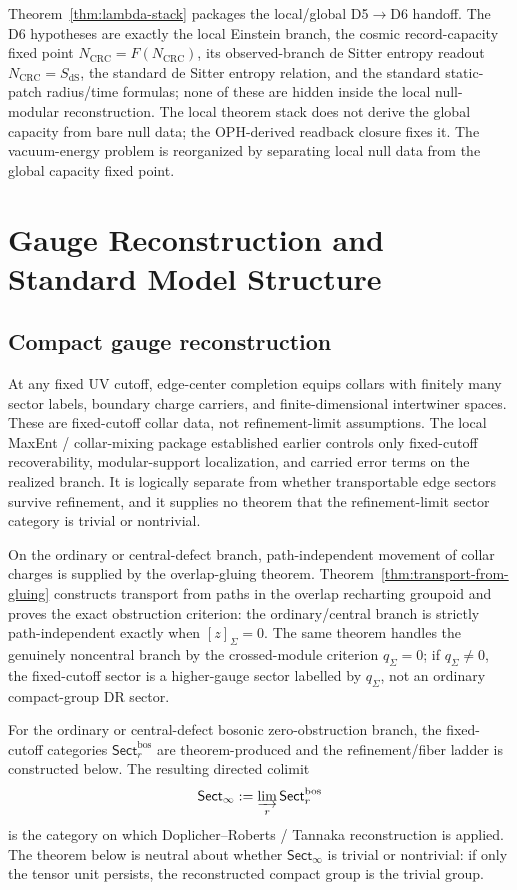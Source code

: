 \documentclass[11pt]{article}
\begin{document}
Theorem~\ref{thm:lambda-stack} packages the local/global D5\(\to\)D6 handoff. The D6 hypotheses are exactly the local Einstein branch, the cosmic record-capacity fixed point \(N_{\mathrm{CRC}}=F(N_{\mathrm{CRC}})\), its observed-branch de Sitter entropy readout \(N_{\mathrm{CRC}}=S_{\mathrm{dS}}\), the standard de Sitter entropy relation, and the standard static-patch radius/time formulas; none of these are hidden inside the local null-modular reconstruction. The local theorem stack does not derive the global capacity from bare null data; the OPH-derived readback closure fixes it. The vacuum-energy problem is reorganized by separating local null data from the global capacity fixed point.

\section{Gauge Reconstruction and Standard Model Structure}

\subsection{Compact gauge reconstruction}

At any fixed UV cutoff, edge-center completion equips collars with finitely many sector labels, boundary charge carriers, and finite-dimensional intertwiner spaces. These are fixed-cutoff collar data, not refinement-limit assumptions. The local MaxEnt / collar-mixing package established earlier controls only fixed-cutoff recoverability, modular-support localization, and carried error terms on the realized branch. It is logically separate from whether transportable edge sectors survive refinement, and it supplies no theorem that the refinement-limit sector category is trivial or nontrivial.

On the ordinary or central-defect branch, path-independent movement of collar charges is supplied by the overlap-gluing theorem. Theorem~\ref{thm:transport-from-gluing} constructs transport from paths in the overlap recharting groupoid and proves the exact obstruction criterion: the ordinary/central branch is strictly path-independent exactly when \([z]_\Sigma=0\). The same theorem handles the genuinely noncentral branch by the crossed-module criterion \(q_\Sigma=0\); if \(q_\Sigma\ne0\), the fixed-cutoff sector is a higher-gauge sector labelled by \(q_\Sigma\), not an ordinary compact-group DR sector.

For the ordinary or central-defect bosonic zero-obstruction branch, the fixed-cutoff categories
\(\mathsf{Sect}^{\mathrm{bos}}_r\) are theorem-produced and the refinement/fiber ladder is
constructed below. The resulting directed colimit
\[
\mathsf{Sect}_\infty := \varinjlim_r \mathsf{Sect}^{\mathrm{bos}}_r
\]
is the category on which Doplicher--Roberts / Tannaka reconstruction is applied. The theorem below
is neutral about whether \(\mathsf{Sect}_\infty\) is trivial or nontrivial: if only the tensor unit
persists, the reconstructed compact group is the trivial group.
\end{document}
